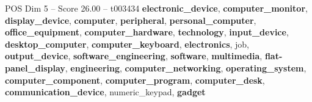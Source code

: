 \begin{textsample}{POS Dim 5 – Score 26.00 – t003434}  \label{ex:f5_pos_038}
\textbf{electronic\_device}, \textbf{computer\_monitor}, \textbf{display\_device}, \textbf{computer}, \textbf{peripheral}, \textbf{personal\_computer}, \textbf{office\_equipment}, \textbf{computer\_hardware}, \textbf{technology}, \textbf{input\_device}, \textbf{desktop\_computer}, \textbf{computer\_keyboard}, \textbf{electronics}, job, \textbf{output\_device}, \textbf{software\_engineering}, \textbf{software}, \textbf{multimedia}, \textbf{flat-panel\_display}, \textbf{engineering}, \textbf{computer\_networking}, \textbf{operating\_system}, \textbf{computer\_component}, \textbf{computer\_program}, \textbf{computer\_desk}, \textbf{communication\_device}, numeric\_keypad, \textbf{gadget}

\end{textsample}
